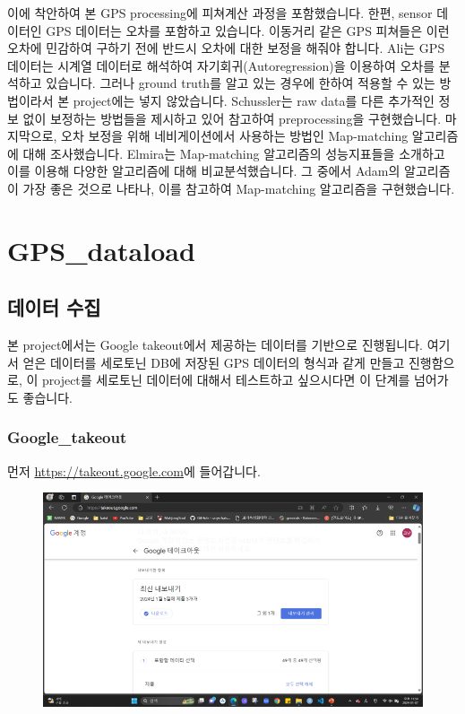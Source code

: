 \documentclass{oblivoir}
\begin{document}
  이에 착안하여 본 GPS processing에 피쳐계산 과정을 포함했습니다.\newline
  한편, sensor 데이터인 GPS 데이터는 오차를 포함하고 있습니다. 이동거리 같은 GPS 피쳐들은 이런 오차에 민감하여 구하기 전에 반드시 오차에 대한 보정을 해줘야 합니다.
  Ali\cite{Ali}는 GPS 데이터는 시계열 데이터로 해석하여 자기회귀(Autoregression)을 이용하여 오차를 분석하고 있습니다.
  그러나 ground truth를 알고 있는 경우에 한하여 적용할 수 있는 방법이라서 본 project에는 넣지 않았습니다.
  Schussler\cite{Schussler}는 raw data를 다른 추가적인 정보 없이 보정하는 방법들을 제시하고 있어 참고하여 preprocessing을 구현했습니다.\newline
  마지막으로, 오차 보정을 위해 네비게이션에서 사용하는 방법인 Map-matching 알고리즘에 대해 조사했습니다.
  Elmira\cite{Elmira}는 Map-matching 알고리즘의 성능지표들을 소개하고 이를 이용해 다양한 알고리즘에 대해 비교분석했습니다.
  그 중에서 Adam\cite{Adam}의 알고리즘이 가장 좋은 것으로 나타나, 이를 참고하여 Map-matching 알고리즘을 구현했습니다.\newpage

  \chapter{GPS\_dataload}
  \section{데이터 수집}
  본 project에서는 Google takeout에서 제공하는 데이터를 기반으로 진행됩니다.
  여기서 얻은 데이터를 세로토닌 DB에 저장된 GPS 데이터의 형식과 같게 만들고 진행함으로, 이 project를 세로토닌 데이터에 대해서 테스트하고 싶으시다면 이 단계를 넘어가도 좋습니다.
  \subsection{Google\_takeout}
  먼저 \url{https://takeout.google.com}에 들어갑니다.
  \begin{figure}[H]
    \includegraphics[width=\textwidth]{Google_takeout_1.png}    
  \end{figure}
\end{document}

